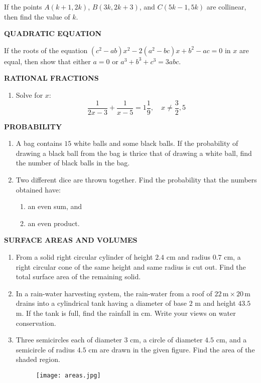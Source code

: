 \documentclass{article}
\begin{document}
If the points \(A(k + 1, 2k)\), \(B(3k, 2k + 3)\), and \(C(5k - 1, 5k)\) are collinear, then find the value of \(k\).

\begin{center}
\textbf{QUADRATIC EQUATION}
\end{center}

If the roots of the equation \((c^2 - ab)x^2 - 2(a^2 - bc)x + b^2 - ac = 0\) in \(x\) are equal, then show that either \(a = 0\) or \(a^3 + b^3 + c^3 = 3abc\).

\begin{center}
\textbf{RATIONAL FRACTIONS}
\end{center}

\begin{enumerate}
    \item Solve for \(x\): 
    \[
    \frac{1}{2x - 3} + \frac{1}{x - 5} = 1 \frac{1}{9},\quad x \neq \frac{3}{2}, 5
    \]
\end{enumerate}

\begin{center}
\textbf{PROBABILITY}
\end{center}

\begin{enumerate}
    \item A bag contains $15$ white balls and some black balls. If the probability of drawing a black ball from the bag is thrice that of drawing a white ball, find the number of black balls in the bag.
    \item Two different dice are thrown together. Find the probability that the numbers obtained have:
    \begin{enumerate}[label=\roman*.]
        \item an even sum, and
        \item an even product.
    \end{enumerate}
\end{enumerate}

\begin{center}
\textbf{SURFACE AREAS AND VOLUMES}
\end{center}

\begin{enumerate}
    \item From a solid right circular cylinder of height $2.4$ cm and radius $0.7$ cm, a right circular cone of the same height and same radius is cut out. Find the total surface area of the remaining solid.
    \item In a rain-water harvesting system, the rain-water from a roof of $22\,\text{m} \times 20\,\text{m}$ drains into a cylindrical tank having a diameter of base $2$ m and height $43.5$ m. If the tank is full, find the rainfall in cm. Write your views on water conservation.
    \item Three semicircles each of diameter $3$ cm, a circle of diameter $4.5$ cm, and a semicircle of radius $4.5$ cm are drawn in the given figure. Find the area of the shaded region.
        \begin{figure}[h!]
            \centering
            \texttt{[image: areas.jpg]}
        \end{figure}
\end{enumerate}
\end{document}
